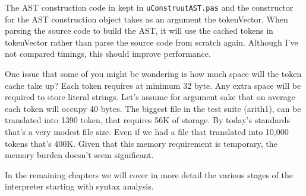 The AST construction code in kept in {\tt uConstruutAST.pas} and the constructor for the AST construction object takes as an argument the tokenVector. When parsing the source code to build the AST, it will use the cached tokens in tokenVector rather than parse the source code from scratch again. Although I've not compared timings, this should improve performance.

One issue that some of you might be wondering is how much space will the token cache take up? Each token requires at minimum 32 byte. Any extra space will be required to store literal strings. Let's assume for argument sake that on average each token will occupy 40 bytes. The biggest file in the test suite (arith1), can be translated into 1390 token, that requires 56K of storage. By today's standards that's a very modest file size. Even if we had a file that translated into 10,000 tokens that's 400K. Given that this memory requirement is temporary, the memory burden doesn't seem significant.

In the remaining chapters we will cover in more detail the various stages of the interpreter starting with syntax analysis.

